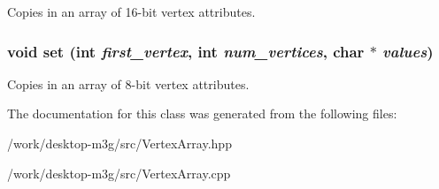 Copies in an array of 16-bit vertex attributes. \hypertarget{classm3g_1_1VertexArray_501a9e6d9b5190b0a9dbfe58a6fd9d2e}{
\subsubsection[{set}]{\setlength{\rightskip}{0pt plus 5cm}void set (int {\em first\_\-vertex}, \/  int {\em num\_\-vertices}, \/  char $\ast$ {\em values})}}
\label{classm3g_1_1VertexArray_501a9e6d9b5190b0a9dbfe58a6fd9d2e}


Copies in an array of 8-bit vertex attributes. 

The documentation for this class was generated from the following files:\begin{CompactItemize}
\item 
/work/desktop-m3g/src/VertexArray.hpp\item 
/work/desktop-m3g/src/VertexArray.cpp\end{CompactItemize}

